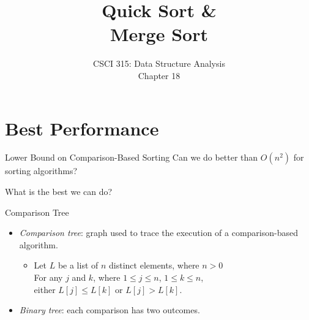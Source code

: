 \documentclass[14pt,aspectratio=1610]{beamer}
\title{\Huge{} Quick Sort \&\\Merge Sort}
\subtitle{CSCI 315: Data Structure Analysis\\Chapter 18}
\institute{Charleston Southern University}
\begin{document}
\begin{frame}
  \titlepage
\end{frame}

\section{Best Performance}

\begin{frame}{Lower Bound on Comparison-Based Sorting}
\center\Large
Can we do better than $O(n^2)$ for sorting algorithms?\vspace{1em}

What is the best we can do?
\end{frame}

\begin{frame}{Comparison Tree}
\large
\begin{itemize}
\item
  \emph{Comparison tree}: graph used to trace the execution of a comparison-based algorithm.
  \begin{itemize}
  \item
    Let $L$ be a list of $n$ distinct elements, where $n > 0$\\
    For any $j$ and $k$, where $1 \le j \le n$,  $1 \le k \le n$,\\
    either $L[j] \le L[k]$  or  $L[j] > L[k] $.
  \end{itemize}
\item
  \emph{Binary tree}: each comparison has two outcomes.
\end{itemize}
\end{frame}
\end{document}
